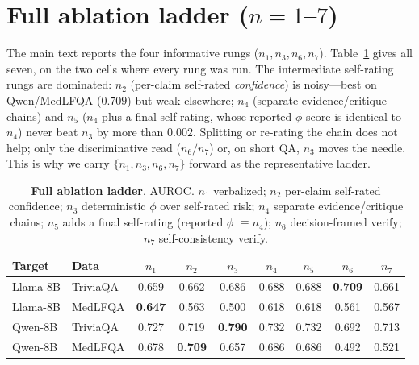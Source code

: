 \documentclass[11pt]{article}
\begin{document}
\section{Full ablation ladder ($n{=}1$--$7$)}\label{app:ladder}
The main text reports the four informative rungs ($n_1,n_3,n_6,n_7$). Table~\ref{tab:ladder}
gives all seven, on the two cells where every rung was run. The intermediate self-rating rungs
are dominated: $n_2$ (per-claim self-rated \emph{confidence}) is noisy---best on Qwen/MedLFQA
($0.709$) but weak elsewhere; $n_4$ (separate evidence/critique chains) and $n_5$ ($n_4$ plus a
final self-rating, whose reported $\phi$ score is identical to $n_4$) never beat $n_3$ by more
than $0.002$. Splitting or re-rating the chain does not help; only the discriminative read
($n_6/n_7$) or, on short QA, $n_3$ moves the needle. This is why we carry $\{n_1,n_3,n_6,n_7\}$
forward as the representative ladder.
\begin{table}[h]
\centering\small
\setlength{\tabcolsep}{3.5pt}
\begin{tabular}{llccccccc}
\toprule
Target & Data & $n_1$ & $n_2$ & $n_3$ & $n_4$ & $n_5$ & $n_6$ & $n_7$ \\
\midrule
Llama-8B & TriviaQA & 0.659 & 0.662 & 0.686 & 0.688 & 0.688 & \textbf{0.709} & 0.661 \\
Llama-8B & MedLFQA  & \textbf{0.647} & 0.563 & 0.500 & 0.618 & 0.618 & 0.561 & 0.567 \\
Qwen-8B  & TriviaQA & 0.727 & 0.719 & \textbf{0.790} & 0.732 & 0.732 & 0.692 & 0.713 \\
Qwen-8B  & MedLFQA  & 0.678 & \textbf{0.709} & 0.657 & 0.686 & 0.686 & 0.492 & 0.521 \\
\bottomrule
\end{tabular}
\caption{\textbf{Full ablation ladder}, AUROC. $n_1$ verbalized; $n_2$ per-claim self-rated
confidence; $n_3$ deterministic $\phi$ over self-rated risk; $n_4$ separate evidence/critique
chains; $n_5$ adds a final self-rating (reported $\phi$ $\equiv n_4$); $n_6$ decision-framed
verify; $n_7$ self-consistency verify.}
\label{tab:ladder}
\end{table}
\end{document}
